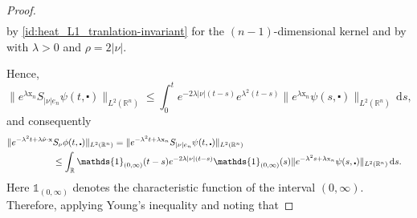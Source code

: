 \documentclass[10pt,a4paper]{amsart}
\newcommand{\R}{\mathbb{R}}
\newcommand{\dd}{\mathrm{d}}
\newcommand{\tm}{\mathrm{t}}
\newcommand{\x}{\mathrm{x}}
\begin{document}
\begin{proof}
\begin{align*}
\end{align*}
by \eqref{id:heat_L1_tranlation-invariant} for the $(n-1)$-dimensional kernel and by
 with $\lambda > 0$ and $\rho = 2 |\nu|$.
%
%
%

%
%
%
Hence,
\[ \| e^{\lambda  \x_n} S_{|\nu| e_n} \psi (t, \centerdot) \|_{L^2(\R^n)} \leq \int_0^t e^{-2\lambda|\nu|(t-s)} e^{\lambda^2(t-s)}  \| e^{\lambda \x_n} \psi(s, \centerdot)\|_{L^2(\R^n)} \, \dd s,  \]
and consequently
\begin{align*}
   \| e^{-\lambda^2 t + \lambda \hat{\nu} \cdot \x} & S_\nu \phi (t, \centerdot) \|_{L^2(\R^n)} = \|e^{-\lambda^2 t + \lambda \x_n} S_{|\nu| e_n} \psi(t, \centerdot)\|_{L^2(\R^{n})}\cr
        &\leq \int_\R \mathds{1}_{(0, \infty)}(t-s) e^{-2\lambda |\nu| (t-s)} \mathds{1}_{(0, \infty)}(s)\|e^{-\lambda^2 s + \lambda \x_n}\psi(s, \centerdot)\|_{L^2(\R^{n})}   \, \dd s.
\end{align*}
Here $\mathds{1}_{(0, \infty)}$ denotes the characteristic function of the interval
$(0, \infty)$.
Therefore, applying Young's inequality and noting that 

\end{proof}
\end{document}
